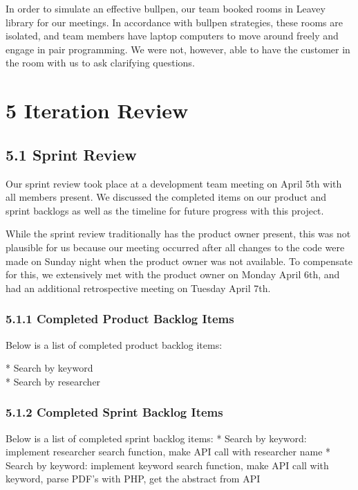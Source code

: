 \documentclass[]{article}
\begin{document}
In order to simulate an effective bullpen, our team booked rooms in
Leavey library for our meetings. In accordance with bullpen strategies,
these rooms are isolated, and team members have laptop computers to move
around freely and engage in pair programming. We were not, however, able
to have the customer in the room with us to ask clarifying questions.

\section{5 Iteration Review}\label{iteration-review}

\subsection{5.1 Sprint Review}\label{sprint-review}

Our sprint review took place at a development team meeting on April 5th
with all members present. We discussed the completed items on our
product and sprint backlogs as well as the timeline for future progress
with this project.

While the sprint review traditionally has the product owner present,
this was not plausible for us because our meeting occurred after all
changes to the code were made on Sunday night when the product owner was
not available. To compensate for this, we extensively met with the product owner on Monday April 6th, and had an additional retrospective meeting on Tuesday April 7th.

\subsubsection{5.1.1 Completed Product Backlog
Items}\label{completed-product-backlog-items}

Below is a list of completed product backlog items: 

* Search by keyword \\
* Search by researcher \\

\subsubsection{5.1.2 Completed Sprint Backlog
Items}\label{completed-sprint-backlog-items}

Below is a list of completed sprint backlog items: * Search by keyword:
implement researcher search function, make API call with researcher name
* Search by keyword: implement keyword search function, make API call
with keyword, parse PDF's with PHP, get the abstract from API
\end{document}
